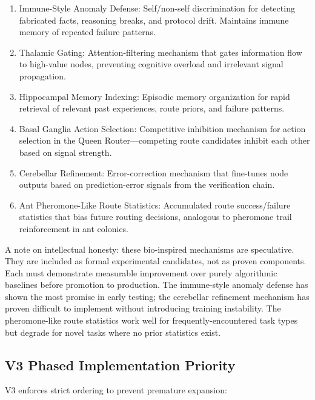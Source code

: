 \documentclass[12pt,a4paper]{article}
\begin{document}
\begin{enumerate}
  \item Immune-Style Anomaly Defense: Self/non-self discrimination for detecting fabricated facts, reasoning breaks, and protocol drift. Maintains immune memory of repeated failure patterns.
  \item Thalamic Gating: Attention-filtering mechanism that gates information flow to high-value nodes, preventing cognitive overload and irrelevant signal propagation.
  \item Hippocampal Memory Indexing: Episodic memory organization for rapid retrieval of relevant past experiences, route priors, and failure patterns.
  \item Basal Ganglia Action Selection: Competitive inhibition mechanism for action selection in the Queen Router---competing route candidates inhibit each other based on signal strength.
  \item Cerebellar Refinement: Error-correction mechanism that fine-tunes node outputs based on prediction-error signals from the verification chain.
  \item Ant Pheromone-Like Route Statistics: Accumulated route success/failure statistics that bias future routing decisions, analogous to pheromone trail reinforcement in ant colonies.
\end{enumerate}

A note on intellectual honesty: these bio-inspired mechanisms are speculative. They are included as formal experimental candidates, not as proven components. Each must demonstrate measurable improvement over purely algorithmic baselines before promotion to production. The immune-style anomaly defense has shown the most promise in early testing; the cerebellar refinement mechanism has proven difficult to implement without introducing training instability. The pheromone-like route statistics work well for frequently-encountered task types but degrade for novel tasks where no prior statistics exist.

\subsection{V3 Phased Implementation Priority}


V3 enforces strict ordering to prevent premature expansion:
\end{document}
